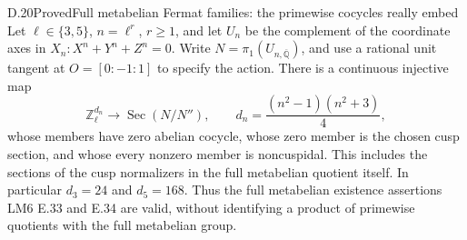 \begin{statement}{D.20}{Proved}{Full metabelian Fermat families: the primewise cocycles really embed}
Let \(\ell\in\{3,5\}\), \(n=\ell^r\), \(r\ge1\), and
let \(U_n\) be the complement of the coordinate axes in
\(X_n:X^n+Y^n+Z^n=0\). Write
\(N=\pi_1(U_{n,\overline{\mathbb Q}})\), and use a rational
unit tangent at \(O=[0:-1:1]\) to specify the action.
There is a continuous injective map
\[
 \mathbb Z_\ell^{d_n}\longrightarrow
 \operatorname{Sec}(N/N''),\qquad
 d_n=\frac{(n^2-1)(n^2+3)}4,                         \tag{D.20.1}
\]
whose members have zero abelian cocycle, whose zero member
is the chosen cusp section, and whose every nonzero member
is noncuspidal. This includes the sections of the cusp
normalizers in the full metabelian quotient itself.
In particular \(d_3=24\) and \(d_5=168\).
Thus the full metabelian existence assertions LM6 E.33
and E.34 are valid, without identifying a product of
primewise quotients with the full metabelian group.
\end{statement}
